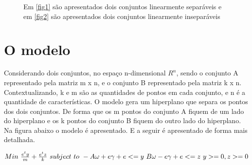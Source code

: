 \begin{figure}
\centering
{}
\qquad
{}
\label{img:linear_sepa}
\caption{Em \ref{fig1} são apresentados dois conjuntos linearmente separáveis e em \ref{fig2} são apresentados dois conjuntos linearmente inseparáveis}
\end{figure}

\section{O modelo}
Considerando dois conjuntos, no espaço n-dimensional $ R^{n} $, sendo o conjunto A representado pela matriz m x n, e o conjunto B representado pela matriz k x n. Contextualizando, k e m são as quantidades de pontos em cada conjunto, e n é a quantidade de características. O modelo gera um hiperplano que separa os pontos dos dois conjuntos. De forma que os m pontos do conjunto A fiquem de um lado do hiperplano e os k pontos do conjunto B fiquem do outro lado do hiperplano. Na figura abaixo o modelo é apresentado. E a seguir é apresentado de forma mais detalhada.

$Min\ \frac{e^{t}y}{m} + \frac{e^{t}z}{k}\\
\ subject\ to  \\
\              -A\omega + e\gamma + e <= y\\
\              B\omega - e\gamma + e <= z\\
\              y>= 0, z>= 0 $

